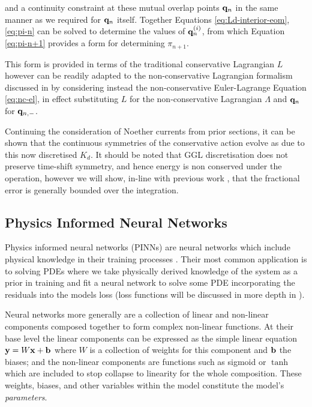 and a continuity constraint at these mutual overlap points $\vb q_n$ in the same manner as we required for $\vb q_n$ itself. Together Equations \eqref{eq:Ld-interior-eom}, \eqref{eq:pi-n} can be solved to determine the values of $\vb q^{(i)}_n$, from which Equation \eqref{eq:pi-n+1} provides a form for determining $\pi_{n + 1}$.

This form is provided in terms of the traditional conservative Lagrangian $L$ however can be readily adapted to the non-conservative Lagrangian formalism discussed in  by considering instead the non-conservative Euler-Lagrange Equation \eqref{eq:nc-el}, in effect substituting $L$ for the non-conservative Lagrangian $\Lambda$ and $\vb q_n$ for $\vb q_{n, -}$.

Continuing the consideration of Noether currents from prior sections, it can be shown that the continuous symmetries of the conservative action evolve as due to this now discretised $K_d$. It should be noted that GGL discretisation does not preserve time-shift symmetry, and hence energy is non conserved under the operation, however we will show, in-line with previous work \cite{tsangSLIMPLECTICINTEGRATORSVARIATIONAL2015}, that the fractional error is generally bounded over the integration.

\subsection{Physics Informed Neural Networks}
\label{sec:intro-pinn}

Physics informed neural networks (PINNs) are neural networks which include physical knowledge in their training processes \cite{raissiPhysicsInformedDeep2017}. Their most common application is to solving PDEs \cite{luDeepXDEDeepLearning2021,mengCompositeNeuralNetwork2020} where we take physically derived knowledge of the system as a prior in training and fit a neural network to solve some PDE incorporating the residuals into the models loss (loss functions will be discussed in more depth in ).

Neural networks more generally are a collection of linear and non-linear components composed together to form complex non-linear functions. At their base level the linear components can be expressed as the simple linear equation \(\vb{y} = W\vb{x} + \vb{b}\) where $W$ is a collection of weights for this component and $\vb{b}$ the biases; and the non-linear components are functions such as sigmoid or $\tanh$ which are included to stop collapse to linearity for the whole composition. These weights, biases, and other variables within the model constitute the model's \emph{parameters}.

